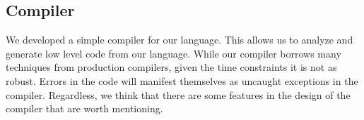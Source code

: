 \subsection{Compiler}

We developed a simple compiler for our language.
This allows us to 	
	analyze and generate low level code from our language.
While our compiler borrows many techniques from production compilers,
	given the time constraints it is not as robust.
Errors in the code will manifest themselves as uncaught exceptions
	in the compiler.
Regardless, we think that there are some features in the design of
	the compiler that are worth mentioning. 







